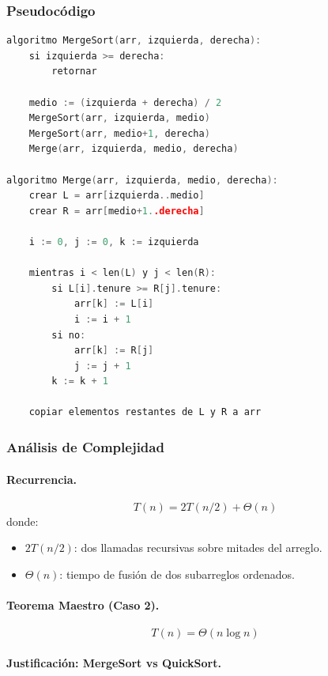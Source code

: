 \documentclass[12pt, a4paper]{article}
\begin{document}
\subsubsection*{Pseudocódigo}

\begin{lstlisting}[language=C++, caption=MergeSort y Merge (orden descendente)]
algoritmo MergeSort(arr, izquierda, derecha):
    si izquierda >= derecha:
        retornar
    
    medio := (izquierda + derecha) / 2
    MergeSort(arr, izquierda, medio)
    MergeSort(arr, medio+1, derecha)
    Merge(arr, izquierda, medio, derecha)

algoritmo Merge(arr, izquierda, medio, derecha):
    crear L = arr[izquierda..medio]
    crear R = arr[medio+1..derecha]
    
    i := 0, j := 0, k := izquierda
    
    mientras i < len(L) y j < len(R):
        si L[i].tenure >= R[j].tenure:
            arr[k] := L[i]
            i := i + 1
        si no:
            arr[k] := R[j]
            j := j + 1
        k := k + 1
    
    copiar elementos restantes de L y R a arr
\end{lstlisting}

\subsubsection*{Análisis de Complejidad}

\paragraph{Recurrencia.}
\[
T(n) = 2T(n/2) + \Theta(n)
\]
donde:
\begin{itemize}
  \item $2T(n/2)$: dos llamadas recursivas sobre mitades del arreglo.
  \item $\Theta(n)$: tiempo de fusión de dos subarreglos ordenados.
\end{itemize}

\paragraph{Teorema Maestro (Caso 2).}
\[
T(n) = \Theta(n \log n)
\]

\paragraph{Justificación: MergeSort vs QuickSort.}
\end{document}
